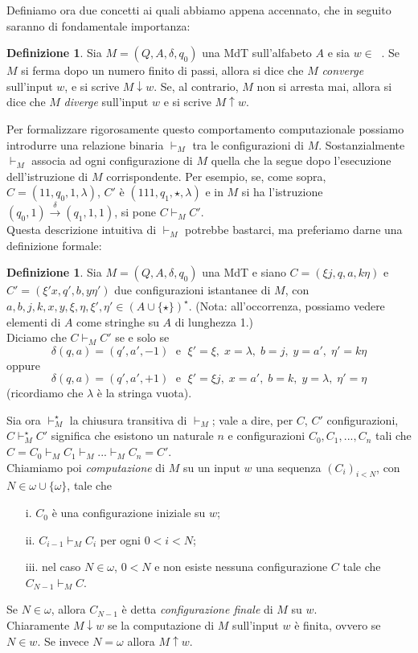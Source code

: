 \documentclass[12pt,a4paper]{report}
\theoremstyle{definition}
\newtheorem{defn}[teo]{Definizione}  %
\DeclareMathOperator{\aaa}{\textit{A}^{\star}}
\begin{document}
Definiamo ora due concetti ai quali abbiamo appena accennato, che in seguito saranno di fondamentale importanza:

\begin{defn}
Sia $M=(Q,A,\delta,q_0)$ una MdT sull'alfabeto $A$ e sia $w \in \aaa$. Se $M$ si ferma dopo un numero finito di passi, allora si dice che $M$ \emph{converge} sull'input $w$, e si scrive $M \downarrow w$. Se, al contrario, $M$ non si arresta mai, allora si dice che $M$ \emph{diverge} sull'input $w$ e si scrive $M \uparrow w$.
\end{defn}

Per formalizzare rigorosamente questo comportamento computazionale possiamo introdurre una relazione binaria $\vdash_M$ tra le configurazioni di $M$. Sostanzialmente $\vdash_M$ associa ad ogni configurazione di $M$ quella che la segue dopo l'esecuzione dell'istruzione di $M$ corrispondente. Per esempio, se, come sopra, $C=(11,q_0,1,\lambda)$, $C'$ è $(111,q_1,\star,\lambda)$ e in $M$ si ha l'istruzione $(q_0,1) \stackrel{\delta}{\longrightarrow} (q_1,1,1)$, si pone $C \vdash_M C'$.\\
Questa descrizione intuitiva di $\vdash_M$ potrebbe bastarci, ma preferiamo darne una definizione formale:

\begin{defn}
Sia $M=(Q,A,\delta,q_0)$ una MdT e siano $C = (\xi j,q,a,k \eta)$ e $C' = (\xi' x,q',b,y \eta')$ due configurazioni istantanee di $M$, con $a, b, j, k, x, y, \xi, \eta, \xi', \eta' \in (A \cup \{\star\})^{\star}$. (Nota: all'occorrenza, possiamo vedere elementi di $A$ come stringhe su $A$ di lunghezza 1.)\\
Diciamo che $C \vdash_M C'$ se e solo se  
$$\delta(q,a)=(q',a',-1) \; \text{ e } \; \xi' = \xi, \; x=\lambda, \; b=j, \; y=a', \; \eta'=k \eta$$
oppure
$$\delta(q,a)=(q',a',+1) \; \text{ e } \; \xi' = \xi j, \; x=a', \; b=k, \; y=\lambda, \; \eta'=\eta$$
(ricordiamo che $\lambda$ è la stringa vuota).
\end{defn}

Sia ora $\vdash^{\star}_M$ la chiusura transitiva di $\vdash_M$; vale a dire, per $C$, $C'$ configurazioni, $C \vdash^{\star}_M C'$ significa che esistono un naturale $n$ e configurazioni $C_0,C_1,...,C_n$ tali che $C=C_0 \vdash_M C_1 \vdash_M ... \vdash_M C_n=C'$.\\
Chiamiamo poi \emph{computazione} di $M$ su un input $w$ una sequenza $(C_i)_{i<N}$, con $N \in \omega \cup \{\omega\}$, tale che 
\begin{enumerate}
\item[i.] $C_0$ è una configurazione iniziale su $w$;
\item[ii.] $C_{i-1} \vdash_M C_i$ per ogni $0 < i < N$; 
\item[iii.] nel caso $N \in \omega$, $0 < N$ e non esiste nessuna configurazione $C$ tale che $C_{N-1} \vdash_M C$.
\end{enumerate}
Se $N \in \omega$, allora $C_{N-1}$ è detta \emph{configurazione finale} di $M$ su $w$.\\
Chiaramente $M \downarrow w$ se la computazione di $M$ sull'input $w$ è finita, ovvero se $N \in w$. Se invece $N=\omega$ allora $M \uparrow w$.
\end{document}
